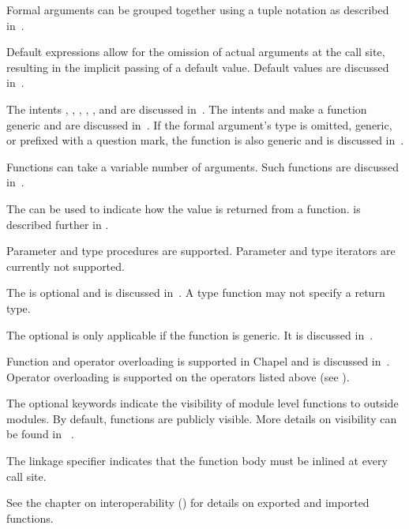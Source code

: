 Formal arguments can be grouped together using a tuple notation as
described in~.

Default expressions allow for the omission of actual arguments at the
call site, resulting in the implicit passing of a default value.
Default values are discussed in~.

The intents , , , , ,  and  are discussed
in~.  The intents  and  make a
function generic and are discussed in~.  If
the formal argument's type is omitted, generic, or prefixed with a
question mark, the function is also generic and is discussed
in~.

Functions can take a variable number of arguments.  Such functions are
discussed in~.

The  can be used to indicate how the value is returned from
a function.   is described further in .

\begin{openissue}
Parameter and type procedures are supported. Parameter and type
iterators are currently not supported.
\end{openissue}

The  is optional and is discussed in~.
A type function may not specify a return type.

The optional  is only applicable if the function is
generic.  It is discussed in~.

Function and operator overloading is supported in Chapel and is
discussed in~.
Operator overloading is supported on the operators listed
above (see ).

The optional  keywords indicate the visibility
of module level functions to outside modules.  By default, functions are
publicly visible.  More details on visibility can be found in
~.

The linkage specifier  indicates that the function body must be inlined at
every call site.

See the chapter on interoperability ()
for details on exported and imported functions.

